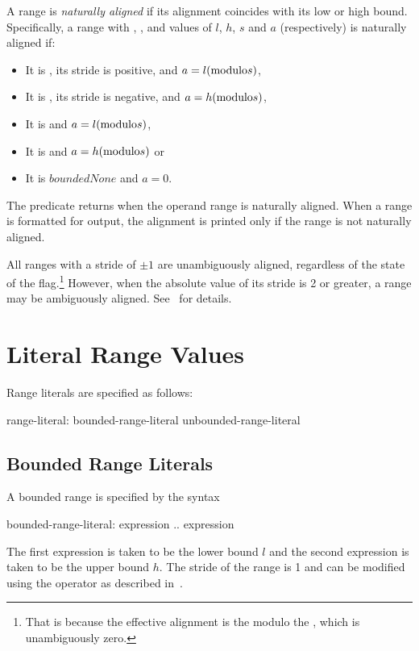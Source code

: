 A range is \emph{naturally aligned} if its alignment coincides with its low or
high bound.  Specifically, a range with , , 
and  values of $l$, $h$, $s$ and $a$ (respectively) is naturally aligned if:
\begin{itemize}
\item It is , its stride is positive, and $a = l ({\rm modulo} s)$,
\item It is , its stride is negative, and $a = h ({\rm modulo} s)$,
\item It is  and $a = l ({\rm modulo} s)$,
\item It is  and $a = h ({\rm modulo} s)$ or
\item It is $boundedNone$ and $a = 0$.
\end{itemize}
\noindent The  predicate returns  when the operand
range is naturally aligned.  When a range is formatted for output, the alignment
is printed only if the range is not naturally aligned.

All ranges with a stride of $\pm 1$ are unambiguously aligned, regardless of the
state of the  flag.\footnote{That is because the effective
alignment is the  modulo the , which is
unambiguously zero.}  However, when the absolute value of its stride is 2 or
greater, a range may be ambiguously aligned.  See~
for details.


\section{Literal Range Values}
\label{Range_Literals}

Range literals are specified as follows:
\begin{syntax}
range-literal:
  bounded-range-literal
  unbounded-range-literal
\end{syntax}

\subsection{Bounded Range Literals}
\label{Bounded_Ranges}

A bounded range is specified by the syntax
\begin{syntax}
bounded-range-literal:
  expression .. expression
\end{syntax}
The first expression is taken to be the lower bound $l$ and the second
expression is taken to be the upper bound $h$.  The stride of the
range is 1 and can be modified using the  operator as described
in~.  

